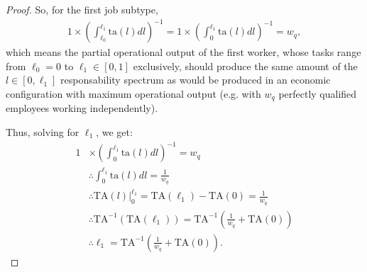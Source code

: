 \documentclass[hidelinks, nonatbib]{elsarticle}
\begin{document}
\begin{lemma}
\begin{proof}
        So, for the first job subtype,
        \begin{gather}
        1 \times \left(
            \int_{\ell_0}^{\ell_1}
            \text{ta}(l)
            dl
        \right) ^ {-1}
        =
        1 \times \left(
            \int_{0}^{\ell_1}
            \text{ta}(l)
            dl
        \right) ^ {-1}
        =
        w_q
        ,
        \end{gather}
        which means the partial operational output of the first worker, whose tasks range from $\ell_0 = 0$ to $\ell_1 \in [0,1]$ exclusively, should produce the same amount of the $l \in [0,\ell_1]$ responsability spectrum as would be produced in an economic configuration with maximum operational output (e.g. with $w_q$ perfectly qualified employees working independently).
        
        Thus, solving for $\ell_1$, we get:
        \begin{align}
        1 
        &\times 
        \left(
            \int_{0}^{\ell_1}
            \text{ta}(l)
            dl
        \right) ^ {-1}
        =
        w_q
        \\
        &\therefore
        \int_{0}^{\ell_1}
        \text{ta}(l)
        dl
        =
        \frac{1}{w_q}
        \\
        &\therefore
        \text{TA}(l)
        \big|_{0}^{\ell_1}
        =
        \text{TA}(\ell_1)
        -
        \text{TA}(0)
        =
        \frac{1}{w_q}
        \\
        &\therefore
        \text{TA}^{-1}(
            \text{TA}(\ell_1)
        )
        =
        \text{TA}^{-1}\left(
            \frac{1}{w_q}
            +
            \text{TA}(0)
        \right)
        \\
        &\therefore
        \ell_1
        =
        \text{TA}^{-1}\left(
            \frac{1}{w_q}
            +
            \text{TA}(0)
        \right)
        .
        \end{align}
        

\end{proof}
\end{lemma}
\end{document}

